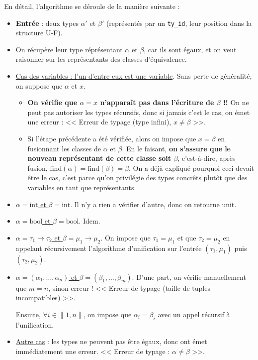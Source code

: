 \documentclass[11pt]{article}
\begin{document}
En détail, l'algorithme se déroule de la manière suivante :
\begin{itemize}
    \item \textbf{Entrée} : deux types $\alpha'$ et $\beta'$ (représentés par un \verb|ty_id|, leur position dans la structure U-F).
    \item On récupère leur type réprésentant $\alpha$ et $\beta$, car ils sont égaux, et on veut raisonner sur les représentants des classes d'équivalence.
    \item \underline{Cas des variables : l'un d'entre eux est une variable}. Sans perte de généralité, on suppose que $\alpha$ et $x$.
    \begin{itemize}
        \item \textbf{On vérifie que $\alpha=x$ n'apparaît pas dans l'écriture de $\beta$ !!} On ne peut pas autoriser les types récursifs, donc si jamais c'est le cas, on émet une erreur : << Erreur de typage (type infini), $x\ne\beta$ >>.
        \item Si l'étape précédente a été vérifiée, alors on impose que $x=\beta$ en fusionnant les classes de $\alpha$ et $\beta$. En le faisant, \textbf{on s'assure que le nouveau représentant de cette classe soit $\beta$}, c'est-à-dire, après fusion, $\text{find}(\alpha)=\text{find}(\beta)=\beta$. On a déjà expliqué pourquoi ceci devait être le cas, c'est parce qu'on privilégie des types concrêts plutôt que des variables en tant que représentants.
    \end{itemize}

    \item \underline{$\alpha=\text{int}$ et $\beta=\text{int}$}. Il n'y a rien a vérifier d'autre, donc on retourne unit.
    \item \underline{$\alpha=\text{bool}$ et $\beta=\text{bool}$}. Idem.
    \item \underline{$\alpha=\tau_1\to\tau_2$ et $\beta=\mu_1\to\mu_2$}. On impose que $\tau_1 = \mu_1$ et que $\tau_2 = \mu_2$ en appelant récursivement l'algorithme d'unification sur l'entrée $(\tau_1, \mu_1)$ puis $(\tau_2, \mu_2)$.
    \item \underline{$\alpha=(\alpha_1, \dots, \alpha_n)$ et $\beta=(\beta_1, \dots, \beta_m)$}. D'une part, on vérifie manuellement que $m=n$, sinon erreur ! << Erreur de typage (taille de tuples incompatibles) >>.
    
    Ensuite, $\forall i\in\left\llbracket1, n\right\rrbracket$, on impose que $\alpha_i=\beta_i$ avec un appel récursif à l'unification.

    \item \underline{Autre cas} : les types ne peuvent pas être égaux, donc ont émet immédiatement une erreur. << Erreur de typage : $\alpha\ne\beta$ >>.
\end{itemize}
\end{document}
